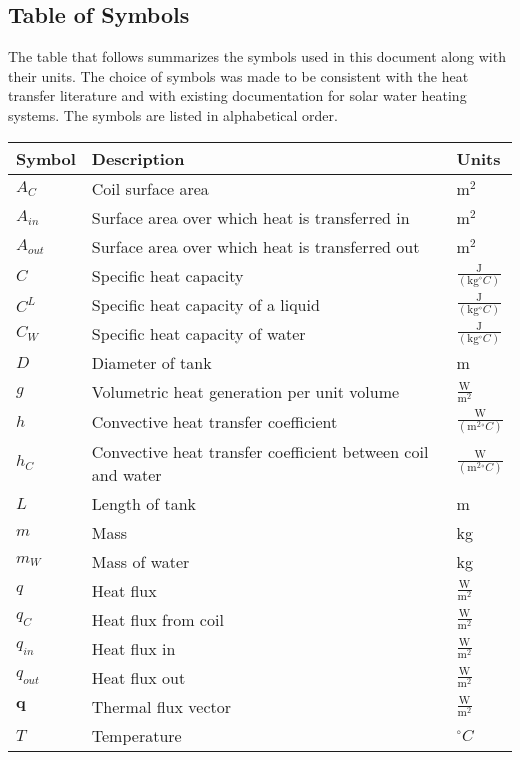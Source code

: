 \documentclass[12pt]{article}
\begin{document}
\subsection{Table of Symbols}
\label{Sec:TablofSymb}
The table that follows summarizes the symbols used in this document along with their units. The choice of symbols was made to be consistent with the heat transfer literature and with existing documentation for solar water heating systems. The symbols are listed in alphabetical order.
\begin{longtable*}{l l l}
\toprule
Symbol & Description & Units
\\
\midrule
$A_{C}$ & Coil surface area & $\text{m}^{2}$
\\
$A_{in}$ & Surface area over which heat is transferred in & $\text{m}^{2}$
\\
$A_{out}$ & Surface area over which heat is transferred out & $\text{m}^{2}$
\\
$C$ & Specific heat capacity & $\frac{\text{J}}{(\text{kg}{}^{\circ}C)}$
\\
$C^{L}$ & Specific heat capacity of a liquid & $\frac{\text{J}}{(\text{kg}{}^{\circ}C)}$
\\
$C_{W}$ & Specific heat capacity of water & $\frac{\text{J}}{(\text{kg}{}^{\circ}C)}$
\\
$D$ & Diameter of tank & m
\\
$g$ & Volumetric heat generation per unit volume & $\frac{\text{W}}{\text{m}^{2}}$
\\
$h$ & Convective heat transfer coefficient & $\frac{\text{W}}{(\text{m}^{2}{}^{\circ}C)}$
\\
$h_{C}$ & Convective heat transfer coefficient between coil and water & $\frac{\text{W}}{(\text{m}^{2}{}^{\circ}C)}$
\\
$L$ & Length of tank & m
\\
$m$ & Mass & kg
\\
$m_{W}$ & Mass of water & kg
\\
$q$ & Heat flux & $\frac{\text{W}}{\text{m}^{2}}$
\\
$q_{C}$ & Heat flux from coil & $\frac{\text{W}}{\text{m}^{2}}$
\\
$q_{in}$ & Heat flux in & $\frac{\text{W}}{\text{m}^{2}}$
\\
$q_{out}$ & Heat flux out & $\frac{\text{W}}{\text{m}^{2}}$
\\
$\mathbf{q}$ & Thermal flux vector & $\frac{\text{W}}{\text{m}^{2}}$
\\
$T$ & Temperature & ${}^{\circ}C$
\\

\end{longtable*}
\end{document}
